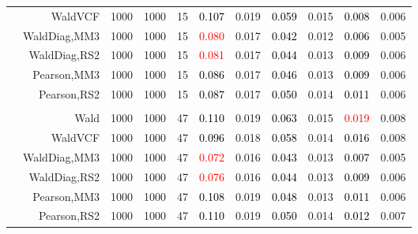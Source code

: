 \documentclass[
]{article}
\begin{document}
\begin{table}[H]
{\begin{tabular}[t]{lrrrrrrrlrr}
\hspace{1em} & WaldVCF & 1000 & 1000 & 15 & \textcolor{black}{0.107} & 0.019 & \textcolor{black}{0.059} & 0.015 & \textcolor{black}{0.008} & 0.006\\

\hspace{1em} & WaldDiag,MM3 & 1000 & 1000 & 15 & \textcolor{red}{0.080} & 0.017 & \textcolor{black}{0.042} & 0.012 & \textcolor{black}{0.006} & 0.005\\

\hspace{1em} & WaldDiag,RS2 & 1000 & 1000 & 15 & \textcolor{red}{0.081} & 0.017 & \textcolor{black}{0.044} & 0.013 & \textcolor{black}{0.009} & 0.006\\

\hspace{1em} & Pearson,MM3 & 1000 & 1000 & 15 & \textcolor{black}{0.086} & 0.017 & \textcolor{black}{0.046} & 0.013 & \textcolor{black}{0.009} & 0.006\\

\hspace{1em} & Pearson,RS2 & 1000 & 1000 & 15 & \textcolor{black}{0.087} & 0.017 & \textcolor{black}{0.050} & 0.014 & \textcolor{black}{0.011} & 0.006\\
\cmidrule{1-11}
\addlinespace[0.3em]
\multicolumn{11}{l}{\textbf{3F 15V}}\\
\hspace{1em} & Wald & 1000 & 1000 & 47 & \textcolor{black}{0.110} & 0.019 & \textcolor{black}{0.063} & 0.015 & \textcolor{red}{0.019} & 0.008\\

\hspace{1em} & WaldVCF & 1000 & 1000 & 47 & \textcolor{black}{0.096} & 0.018 & \textcolor{black}{0.058} & 0.014 & \textcolor{black}{0.016} & 0.008\\

\hspace{1em} & WaldDiag,MM3 & 1000 & 1000 & 47 & \textcolor{red}{0.072} & 0.016 & \textcolor{black}{0.043} & 0.013 & \textcolor{black}{0.007} & 0.005\\

\hspace{1em} & WaldDiag,RS2 & 1000 & 1000 & 47 & \textcolor{red}{0.076} & 0.016 & \textcolor{black}{0.044} & 0.013 & \textcolor{black}{0.009} & 0.006\\

\hspace{1em} & Pearson,MM3 & 1000 & 1000 & 47 & \textcolor{black}{0.108} & 0.019 & \textcolor{black}{0.048} & 0.013 & \textcolor{black}{0.011} & 0.006\\

\hspace{1em} & Pearson,RS2 & 1000 & 1000 & 47 & \textcolor{black}{0.110} & 0.019 & \textcolor{black}{0.050} & 0.014 & \textcolor{black}{0.012} & 0.007\\
\bottomrule
\end{tabular}}
\endgroup{}
\end{table}
\end{document}
